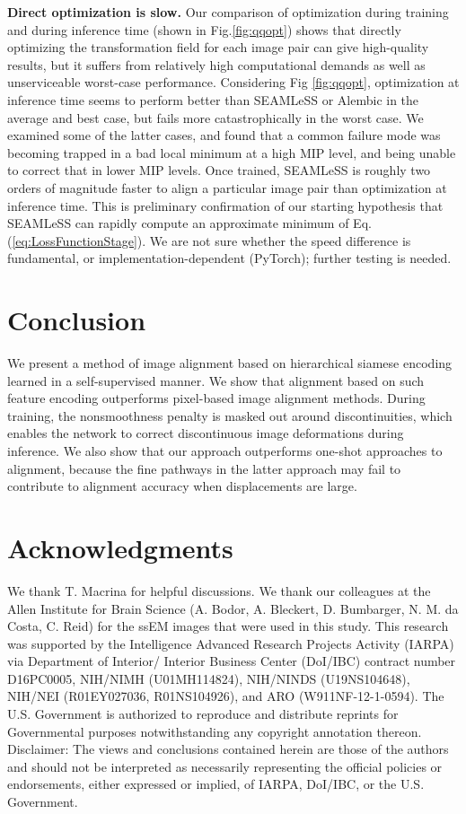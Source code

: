 \documentclass{article}
\begin{document}
\textbf {Direct optimization is slow. } Our comparison of optimization during training and during inference time (shown in Fig.\ref{fig:qqopt}) shows that directly optimizing the transformation field for each image pair can give high-quality results, but it suffers from relatively high computational demands as well as unserviceable worst-case performance. Considering Fig \ref{fig:qqopt}, optimization at inference time seems to perform better than SEAMLeSS or Alembic in the average and best case, but fails more catastrophically in the worst case. We examined some of the latter cases, and found that a common failure mode was becoming trapped in a bad local minimum at a high MIP level, and being unable to correct that in lower MIP levels. Once trained, SEAMLeSS is roughly two orders of magnitude faster to align a particular image pair than optimization at inference time. This is preliminary confirmation of our starting hypothesis that SEAMLeSS can rapidly compute an approximate minimum of Eq. (\ref{eq:LossFunctionStage}). We are not sure whether the speed difference is fundamental, or implementation-dependent (PyTorch); further testing is needed.

\section{Conclusion}
We present a method of image alignment based on hierarchical siamese encoding learned in a self-supervised manner. We show that alignment based on such feature encoding outperforms pixel-based image alignment methods. During training, the nonsmoothness penalty is masked out around discontinuities, which enables the network to correct discontinuous image deformations during inference.  We also show that our approach outperforms one-shot approaches to alignment, because the fine pathways in the latter approach may fail to contribute to alignment accuracy when displacements are large.


\section*{Acknowledgments}
We thank T. Macrina for helpful discussions. We thank our colleagues at the Allen Institute for Brain Science (A. Bodor, A. Bleckert, D. Bumbarger, N. M. da Costa, C. Reid) for the ssEM images that were used in this study. This research was supported by the Intelligence Advanced Research Projects Activity (IARPA) via Department of Interior/ Interior
Business Center (DoI/IBC) contract number D16PC0005, NIH/NIMH (U01MH114824), NIH/NINDS (U19NS104648), NIH/NEI (R01EY027036, R01NS104926), and ARO (W911NF-12-1-0594).
The U.S. Government is authorized to reproduce and
distribute reprints for Governmental purposes notwithstanding any copyright annotation thereon.
Disclaimer: The views and conclusions contained herein are those of the authors and should not be interpreted as
necessarily representing the official policies or endorsements, either expressed or implied, of IARPA, DoI/IBC, or the
U.S. Government.  
\end{document}
